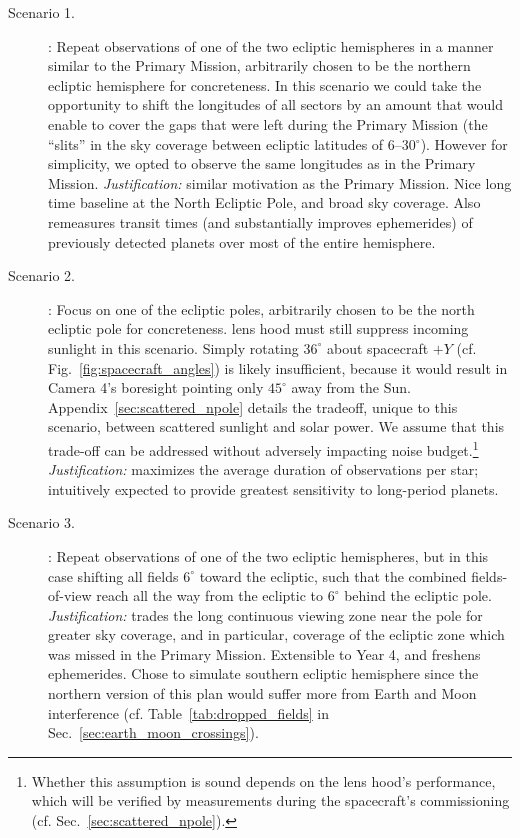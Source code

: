 \begin{description}

\item[Scenario 1.] \nhemi: Repeat observations of one of the two
  ecliptic hemispheres in a manner similar to the Primary Mission,
  arbitrarily chosen to be the northern ecliptic hemisphere for
  concreteness. In this scenario we could take the opportunity to 
  shift the longitudes of all sectors by an amount that would enable 
  \tess to cover the gaps that were left during the Primary Mission 
  (the ``slits'' in the sky coverage between ecliptic latitudes of 
  6--30$^\circ$).
  However for simplicity, we opted to observe the same longitudes as
  in the Primary Mission.
  \textit{Justification:} similar motivation as the Primary Mission.
  Nice long time baseline at the North Ecliptic Pole, and broad sky
  coverage. Also remeasures transit times (and substantially improves 
  ephemerides)
  of previously detected \tess planets over most of the entire
  hemisphere.

\item[Scenario 2.] \npole: Focus on one of the ecliptic poles,
	arbitrarily chosen to be the north ecliptic pole for
	concreteness. \tesss lens hood must still
	suppress incoming sunlight in this scenario.
	Simply rotating $36^\circ$ about spacecraft $+Y$ (cf. 
	Fig.~\ref{fig:spacecraft_angles}) is likely insufficient, because
	it would result in Camera 4's boresight pointing only $45^\circ$
	away from the Sun. Appendix~\ref{sec:scattered_npole} details the
	tradeoff, unique to this scenario, between scattered sunlight and solar 
	power.
	We assume that this trade-off can be addressed without adversely
	impacting \tesss noise budget.\footnote{Whether this 
		assumption is sound depends on the lens hood's performance,
		which will be verified by measurements during the spacecraft's 
		commissioning (cf. Sec.~\ref{sec:scattered_npole}).}
	\textit{Justification:} maximizes the average duration of
	observations per star; intuitively expected to provide
	greatest sensitivity to long-period planets.

\item[Scenario 3.] \shemiAvoid: Repeat observations of one of the two
  ecliptic hemispheres, but in this case shifting all fields $6^\circ$
  toward the ecliptic, such that the combined fields-of-view reach all
  the way from the ecliptic to $6^\circ$ behind the ecliptic pole.
  \textit{Justification:} trades the long continuous viewing zone near
  the pole for greater sky coverage, and in particular, coverage of
  the ecliptic zone which was missed in the Primary Mission. Extensible
  to Year 4, and freshens ephemerides. Chose
  to simulate southern ecliptic hemisphere since the northern
  version of this plan would suffer more from Earth and Moon interference
  (cf. Table~\ref{tab:dropped_fields} in
  Sec.~\ref{sec:earth_moon_crossings}).
  

\end{description}
